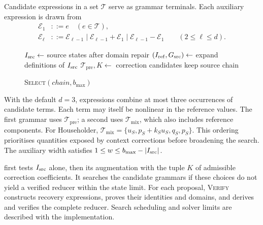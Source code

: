 Candidate expressions in a set $\mathcal T$ serve as grammar terminals. Each auxiliary expression is drawn from
\[
\begin{aligned}
\mathcal E_1&::=e\quad(e\in\mathcal T),\\
\mathcal E_\ell&::=\mathcal E_{\ell-1}
 \mid\mathcal E_{\ell-1}+\mathcal E_1
 \mid\mathcal E_{\ell-1}-\mathcal E_1
 \qquad(2\le\ell\le d).
\end{aligned}
\]
\begingroup
\setlength{\intextsep}{4pt}
\begin{figure}
\begin{minipage}{\linewidth}
\begin{algorithm}[H]
\small
\SetInd{0.5em}{0.7em}
\caption{\textsc{Select}$(\mathit{chain},b_{\max})$}
\label{alg:select}
$I_{\mathrm{src}}\leftarrow$ source states after domain repair\;
$(I_{\mathrm{ref}},G_{\mathrm{src}})\leftarrow$ expand definitions of $I_{\mathrm{src}}$\;
$\mathcal T_{\mathrm{pre}},K\leftarrow$ correction candidates\;
\Return keep source chain\;
\end{algorithm}
\end{minipage}
\end{figure}
With the default $d=3$, expressions combine at most three occurrences of candidate terms.
Each term may itself be nonlinear in the reference values.
The first grammar uses $\mathcal T_{\mathrm{pre}}$; a second uses $\mathcal T_{\mathrm{mix}}$, which also includes reference components.
For Householder, $\mathcal T_{\mathrm{mix}}=\{u_S,p_S+k_Su_S,q_S,p_S\}$.
This ordering prioritises quantities exposed by context corrections before broadening the search.
The auxiliary width satisfies $1\le w\le b_{\max}-|I_{\mathrm{src}}|$.

 first tests $I_{\mathrm{src}}$ alone, then its augmentation with the tuple $K$ of admissible correction coefficients.
It searches the candidate grammars if these choices do not yield a verified reducer within the state limit.
For each proposal, \textsc{Verify} constructs recovery expressions, proves their identities and domains, and derives and verifies the complete reducer.
Search scheduling and solver limits are described with the implementation.

